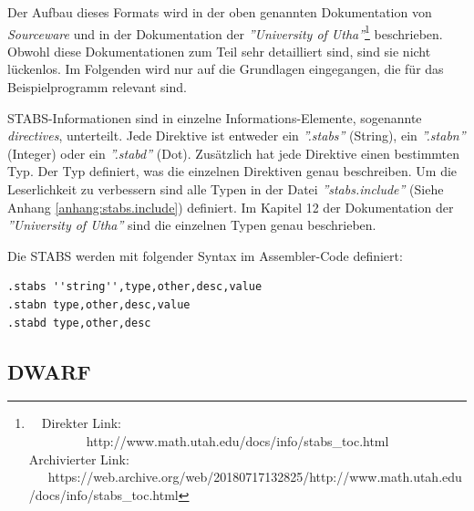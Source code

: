 Der Aufbau dieses Formats wird in der oben genannten Dokumentation von \textit{Sourceware} und in der Dokumentation der \textit{''University of Utha''}\footnote{\ \ Direkter Link: \ \ \ \ \ \ \ \ \ http://www.math.utah.edu/docs/info/stabs\_toc.html\\ Archivierter Link: \ \ \ https://web.archive.org/web/20180717132825/http://www.math.utah.edu/docs/info/stabs\_toc.html} beschrieben.
Obwohl diese Dokumentationen zum Teil sehr detailliert sind, sind sie nicht lückenlos.
Im Folgenden wird nur auf die Grundlagen eingegangen, die für das Beispielprogramm relevant sind.

STABS-Informationen sind in einzelne Informations-Elemente, sogenannte \textit{directives}, unterteilt.
Jede Direktive ist entweder ein \textit{''.stabs''} (String), ein \textit{''.stabn''} (Integer) oder ein \textit{''.stabd''} (Dot).
Zusätzlich hat jede Direktive einen bestimmten Typ.
Der Typ definiert, was die einzelnen Direktiven genau beschreiben.
Um die Leserlichkeit zu verbessern sind alle Typen in der Datei \textit{''stabs.include''} (Siehe Anhang \ref{anhang:stabs.include}) definiert.
Im Kapitel 12 der Dokumentation der \textit{''University of Utha''} sind die einzelnen Typen genau beschrieben.

Die STABS werden mit folgender Syntax im Assembler-Code definiert:\\
\lstset{language=plain}
\begin{lstlisting}
.stabs ''string'',type,other,desc,value
.stabn type,other,desc,value
.stabd type,other,desc
\end{lstlisting}



\subsection{DWARF}


